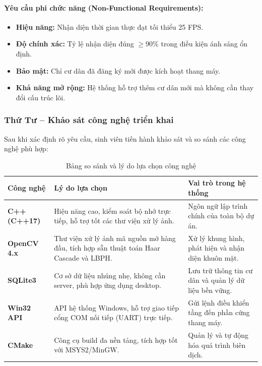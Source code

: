 \documentclass[12pt,a4paper]{article}
\begin{document}
\paragraph{Yêu cầu phi chức năng (Non-Functional Requirements):}
\begin{itemize}[leftmargin=1.5cm]
    \item \textbf{Hiệu năng:} Nhận diện thời gian thực đạt tối thiểu 25 FPS.
    \item \textbf{Độ chính xác:} Tỷ lệ nhận diện đúng $\geq 90\%$ trong điều kiện ánh sáng ổn định.
    \item \textbf{Bảo mật:} Chỉ cư dân đã đăng ký mới được kích hoạt thang máy.
    \item \textbf{Khả năng mở rộng:} Hệ thống hỗ trợ thêm cư dân mới mà không cần thay đổi cấu trúc lõi.
\end{itemize}

\subsubsection{Thứ Tư -- Khảo sát công nghệ triển khai}

Sau khi xác định rõ yêu cầu, sinh viên tiến hành khảo sát và so sánh các công nghệ phù hợp:

\begin{table}[H]
    \centering
    \renewcommand{\arraystretch}{1.4}
    \begin{tabular}{|>{\bfseries}p{3cm}|p{4.5cm}|p{6cm}|}
        \hline
        \rowcolor{lightblue}
        \textbf{Công nghệ} & \textbf{Lý do lựa chọn} & \textbf{Vai trò trong hệ thống} \\
        \hline
        C++ (C++17) & Hiệu năng cao, kiểm soát bộ nhớ trực tiếp, hỗ trợ tốt các thư viện xử lý ảnh. & Ngôn ngữ lập trình chính của toàn bộ dự án. \\
        \hline
        OpenCV 4.x & Thư viện xử lý ảnh mã nguồn mở hàng đầu, tích hợp sẵn thuật toán Haar Cascade và LBPH. & Xử lý khung hình, phát hiện và nhận diện khuôn mặt. \\
        \hline
        SQLite3 & Cơ sở dữ liệu nhúng nhẹ, không cần server, phù hợp ứng dụng desktop. & Lưu trữ thông tin cư dân và quản lý dữ liệu bền vững. \\
        \hline
        Win32 API & API hệ thống Windows, hỗ trợ giao tiếp cổng COM nối tiếp (UART) trực tiếp. & Gửi lệnh điều khiển tầng đến phần cứng thang máy. \\
        \hline
        CMake & Công cụ build đa nền tảng, tích hợp tốt với MSYS2/MinGW. & Quản lý và tự động hóa quá trình biên dịch. \\
        \hline
    \end{tabular}
    \caption{Bảng so sánh và lý do lựa chọn công nghệ}
\end{table}
\end{document}

